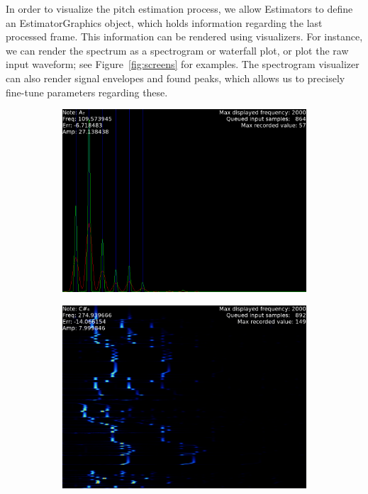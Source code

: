 \documentclass[a4paper,10pt,twocolumn]{article}
\begin{document}
In order to visualize the pitch estimation process, we allow Estimators to define an EstimatorGraphics object, which holds information regarding the last processed frame. This information can be rendered using visualizers. For instance, we can render the spectrum as a spectrogram or waterfall plot, or plot the raw input waveform; see Figure~\ref{fig:screens} for examples. The spectrogram visualizer can also render signal envelopes and found peaks, which allows us to precisely fine-tune parameters regarding these.
\begin{figure}[p!]
    \centering
    \begin{subfigure}{\linewidth}
        \includegraphics[width=\linewidth]{fig/digi_spec.png}
    \end{subfigure}
    \begin{subfigure}{\linewidth}
        \includegraphics[width=\linewidth]{fig/digi_water.png}

\end{subfigure}
\end{figure}
\end{document}
